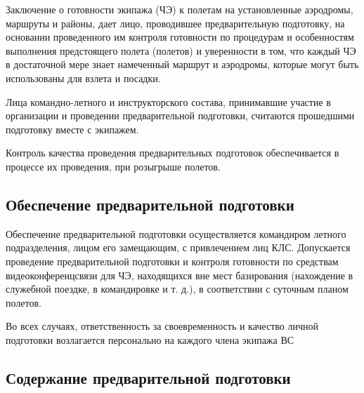Заключение о готовности экипажа (ЧЭ) к полетам на установленные аэродромы, маршруты и районы, дает лицо, проводившее предварительную подготовку, на основании проведенного им контроля готовности по процедурам и особенностям выполнения предстоящего полета (полетов) и уверенности в том, что каждый ЧЭ в достаточной мере знает намеченный маршрут и аэродромы, которые могут быть использованы для взлета и посадки.

Лица командно-летного и инструкторского состава, принимавшие участие в организации и проведении предварительной подготовки, считаются прошедшими подготовку вместе с экипажем.

Контроль качества проведения предварительных подготовок обеспечивается в процессе их проведения, при розыгрыше полетов.

\subsection{Обеспечение предварительной подготовки}


Обеспечение предварительной подготовки осуществляется командиром летного подразделения, лицом его замещающим, с привлечением лиц КЛС.
Допускается проведение предварительной подготовки и контроля готовности по средствам видеоконференцсвязи для ЧЭ, находящихся вне мест базирования (нахождение в служебной поездке, в командировке и т. д.), в соответствии с суточным планом полетов.

Во всех случаях, ответственность за своевременность и качество личной подготовки возлагается персонально на каждого члена экипажа ВС

\subsection{Содержание предварительной подготовки}


